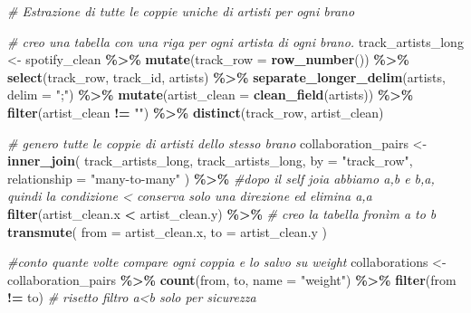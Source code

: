 \documentclass[
]{article}
\newenvironment{Shaded}{\begin{snugshade}}{\end{snugshade}}
\newcommand{\AttributeTok}[1]{\textcolor[rgb]{0.13,0.29,0.53}{#1}}
\newcommand{\CommentTok}[1]{\textcolor[rgb]{0.56,0.35,0.01}{\textit{#1}}}
\newcommand{\FunctionTok}[1]{\textcolor[rgb]{0.13,0.29,0.53}{\textbf{#1}}}
\newcommand{\NormalTok}[1]{#1}
\newcommand{\OtherTok}[1]{\textcolor[rgb]{0.56,0.35,0.01}{#1}}
\newcommand{\SpecialCharTok}[1]{\textcolor[rgb]{0.81,0.36,0.00}{\textbf{#1}}}
\newcommand{\StringTok}[1]{\textcolor[rgb]{0.31,0.60,0.02}{#1}}
\begin{document}
\begin{Shaded}
\begin{Highlighting}[]
\CommentTok{\# Estrazione di tutte le coppie uniche di artisti per ogni brano}

\CommentTok{\# creo una tabella con una riga per ogni artista di ogni brano.}
\NormalTok{track\_artists\_long }\OtherTok{\textless{}{-}}\NormalTok{ spotify\_clean }\SpecialCharTok{\%\textgreater{}\%}
  \FunctionTok{mutate}\NormalTok{(}\AttributeTok{track\_row =} \FunctionTok{row\_number}\NormalTok{()) }\SpecialCharTok{\%\textgreater{}\%}
  \FunctionTok{select}\NormalTok{(track\_row, track\_id, artists) }\SpecialCharTok{\%\textgreater{}\%}
  \FunctionTok{separate\_longer\_delim}\NormalTok{(artists, }\AttributeTok{delim =} \StringTok{";"}\NormalTok{) }\SpecialCharTok{\%\textgreater{}\%}
  \FunctionTok{mutate}\NormalTok{(}\AttributeTok{artist\_clean =} \FunctionTok{clean\_field}\NormalTok{(artists)) }\SpecialCharTok{\%\textgreater{}\%}
  \FunctionTok{filter}\NormalTok{(artist\_clean }\SpecialCharTok{!=} \StringTok{""}\NormalTok{) }\SpecialCharTok{\%\textgreater{}\%}
  \FunctionTok{distinct}\NormalTok{(track\_row, artist\_clean)}

\CommentTok{\# genero tutte le coppie di artisti dello stesso brano}
\NormalTok{collaboration\_pairs }\OtherTok{\textless{}{-}} \FunctionTok{inner\_join}\NormalTok{(}
\NormalTok{  track\_artists\_long,}
\NormalTok{  track\_artists\_long,}
  \AttributeTok{by =} \StringTok{"track\_row"}\NormalTok{,}
  \AttributeTok{relationship =} \StringTok{"many{-}to{-}many"}
\NormalTok{) }\SpecialCharTok{\%\textgreater{}\%}
  \CommentTok{\#dopo il self joia abbiamo a,b e b,a, quindi la condizione \textless{} conserva solo una direzione ed elimina a,a }
  \FunctionTok{filter}\NormalTok{(artist\_clean.x }\SpecialCharTok{\textless{}}\NormalTok{ artist\_clean.y) }\SpecialCharTok{\%\textgreater{}\%}
  \CommentTok{\# creo la tabella fronìm a to b}
  \FunctionTok{transmute}\NormalTok{(}
    \AttributeTok{from =}\NormalTok{ artist\_clean.x,}
    \AttributeTok{to =}\NormalTok{ artist\_clean.y}
\NormalTok{  )}

\CommentTok{\#conto quante volte compare ogni coppia e lo salvo su weight}
\NormalTok{collaborations }\OtherTok{\textless{}{-}}\NormalTok{ collaboration\_pairs }\SpecialCharTok{\%\textgreater{}\%}
  \FunctionTok{count}\NormalTok{(from, to, }\AttributeTok{name =} \StringTok{"weight"}\NormalTok{) }\SpecialCharTok{\%\textgreater{}\%}
  \FunctionTok{filter}\NormalTok{(from }\SpecialCharTok{!=}\NormalTok{ to) }\CommentTok{\# risetto filtro a\textless{}b solo per sicurezza}


\end{Highlighting}
\end{Shaded}
\end{document}
